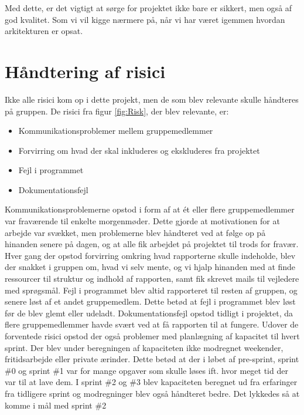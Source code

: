 Med dette, er det vigtigt at sørge for projektet ikke bare er sikkert, men også af god kvalitet. Som vi vil kigge nærmere på, når vi har været igemmen hvordan arkitekturen er opsat. 


\section{Håndtering af risici}\label{sec:handling_risks}
Ikke alle risici kom op i dette projekt, men de som blev relevante skulle håndteres på gruppen. De risici fra figur \ref{fig:Risk}, der blev relevante, er:
\begin{itemize}
    \item Kommunikationsproblemer mellem gruppemedlemmer
    \item Forvirring om hvad der skal inkluderes og ekskluderes fra projektet
    \item Fejl i programmet
    \item Dokumentationsfejl
\end{itemize}

Kommunikationsproblemerne opstod i form af at ét eller flere gruppemedlemmer var fraværende til enkelte morgenmøder. Dette gjorde at motivationen for at arbejde var svækket, men problemerne blev håndteret ved at følge op på hinanden senere på dagen, og at alle fik arbejdet på projektet til trods for fravær. 
Hver gang der opstod forvirring omkring hvad rapporterne skulle indeholde, blev der snakket i gruppen om, hvad vi selv mente, og vi hjalp hinanden med at finde ressourcer til struktur og indhold af rapporten, samt fik skrevet mails til vejledere med sprøgsmål.
Fejl i programmet blev altid rapporteret til resten af gruppen, og senere løst af et andet gruppemedlem. Dette betød at fejl i programmet blev løst før de blev glemt eller udeladt. 
Dokumentationsfejl opstod tidligt i projektet, da flere gruppemedlemmer havde svært ved at få rapporten til at fungere. 
Udover de forventede risici opstod der også problemer med planlægning af kapacitet til hvert sprint. Der blev under beregningen af kapaciteten ikke modregnet weekender, fritidsarbejde eller private ærinder. Dette betød at der i løbet af pre-sprint, sprint \#0 og sprint \#1 var for mange opgaver som skulle løses ift. hvor meget tid der var til at lave dem. I sprint \#2 og \#3 blev kapaciteten beregnet ud fra erfaringer fra tidligere sprint og modregninger blev også håndteret bedre. Det lykkedes så at komme i mål med sprint \#2 %